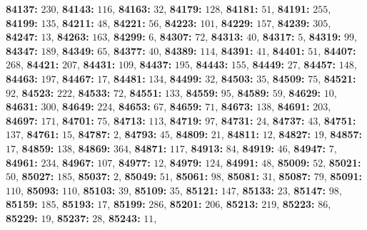 \textsf{\bfseries 84137:} $230$, \textsf{\bfseries 84143:} $116$, \textsf{\bfseries 84163:} $32$, \textsf{\bfseries 84179:} $128$, \textsf{\bfseries 84181:} $51$, \textsf{\bfseries 84191:} $255$, \textsf{\bfseries 84199:} $135$, \textsf{\bfseries 84211:} $48$, \textsf{\bfseries 84221:} $56$, \textsf{\bfseries 84223:} $101$, \textsf{\bfseries 84229:} $157$, \textsf{\bfseries 84239:} $305$, \textsf{\bfseries 84247:} $13$, \textsf{\bfseries 84263:} $163$, \textsf{\bfseries 84299:} $6$, \textsf{\bfseries 84307:} $72$, \textsf{\bfseries 84313:} $40$, \textsf{\bfseries 84317:} $5$, \textsf{\bfseries 84319:} $99$, \textsf{\bfseries 84347:} $189$, \textsf{\bfseries 84349:} $65$, \textsf{\bfseries 84377:} $40$, \textsf{\bfseries 84389:} $114$, \textsf{\bfseries 84391:} $41$, \textsf{\bfseries 84401:} $51$, \textsf{\bfseries 84407:} $268$, \textsf{\bfseries 84421:} $207$, \textsf{\bfseries 84431:} $109$, \textsf{\bfseries 84437:} $195$, \textsf{\bfseries 84443:} $155$, \textsf{\bfseries 84449:} $27$, \textsf{\bfseries 84457:} $148$, \textsf{\bfseries 84463:} $197$, \textsf{\bfseries 84467:} $17$, \textsf{\bfseries 84481:} $134$, \textsf{\bfseries 84499:} $32$, \textsf{\bfseries 84503:} $35$, \textsf{\bfseries 84509:} $75$, \textsf{\bfseries 84521:} $92$, \textsf{\bfseries 84523:} $222$, \textsf{\bfseries 84533:} $72$, \textsf{\bfseries 84551:} $133$, \textsf{\bfseries 84559:} $95$, \textsf{\bfseries 84589:} $59$, \textsf{\bfseries 84629:} $10$, \textsf{\bfseries 84631:} $300$, \textsf{\bfseries 84649:} $224$, \textsf{\bfseries 84653:} $67$, \textsf{\bfseries 84659:} $71$, \textsf{\bfseries 84673:} $138$, \textsf{\bfseries 84691:} $203$, \textsf{\bfseries 84697:} $171$, \textsf{\bfseries 84701:} $75$, \textsf{\bfseries 84713:} $113$, \textsf{\bfseries 84719:} $97$, \textsf{\bfseries 84731:} $24$, \textsf{\bfseries 84737:} $43$, \textsf{\bfseries 84751:} $137$, \textsf{\bfseries 84761:} $15$, \textsf{\bfseries 84787:} $2$, \textsf{\bfseries 84793:} $45$, \textsf{\bfseries 84809:} $21$, \textsf{\bfseries 84811:} $12$, \textsf{\bfseries 84827:} $19$, \textsf{\bfseries 84857:} $17$, \textsf{\bfseries 84859:} $138$, \textsf{\bfseries 84869:} $364$, \textsf{\bfseries 84871:} $117$, \textsf{\bfseries 84913:} $84$, \textsf{\bfseries 84919:} $46$, \textsf{\bfseries 84947:} $7$, \textsf{\bfseries 84961:} $234$, \textsf{\bfseries 84967:} $107$, \textsf{\bfseries 84977:} $12$, \textsf{\bfseries 84979:} $124$, \textsf{\bfseries 84991:} $48$, \textsf{\bfseries 85009:} $52$, \textsf{\bfseries 85021:} $50$, \textsf{\bfseries 85027:} $185$, \textsf{\bfseries 85037:} $2$, \textsf{\bfseries 85049:} $51$, \textsf{\bfseries 85061:} $98$, \textsf{\bfseries 85081:} $31$, \textsf{\bfseries 85087:} $79$, \textsf{\bfseries 85091:} $110$, \textsf{\bfseries 85093:} $110$, \textsf{\bfseries 85103:} $39$, \textsf{\bfseries 85109:} $35$, \textsf{\bfseries 85121:} $147$, \textsf{\bfseries 85133:} $23$, \textsf{\bfseries 85147:} $98$, \textsf{\bfseries 85159:} $185$, \textsf{\bfseries 85193:} $17$, \textsf{\bfseries 85199:} $286$, \textsf{\bfseries 85201:} $206$, \textsf{\bfseries 85213:} $219$, \textsf{\bfseries 85223:} $86$, \textsf{\bfseries 85229:} $19$, \textsf{\bfseries 85237:} $28$, \textsf{\bfseries 85243:} $11$, 
